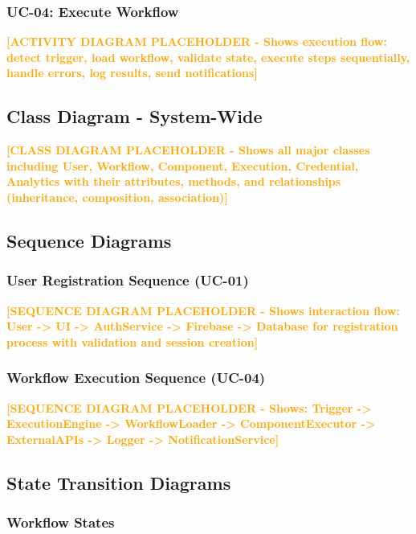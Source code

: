 \documentclass[12pt,a4paper]{article}
\begin{document}
\subsubsection{UC-04: Execute Workflow}

\textcolor{orange}{\textbf{[ACTIVITY DIAGRAM PLACEHOLDER - Shows execution flow: detect trigger, load workflow, validate state, execute steps sequentially, handle errors, log results, send notifications]}}

\subsection{Class Diagram - System-Wide}

\textcolor{orange}{\textbf{[CLASS DIAGRAM PLACEHOLDER - Shows all major classes including User, Workflow, Component, Execution, Credential, Analytics with their attributes, methods, and relationships (inheritance, composition, association)]}}

\subsection{Sequence Diagrams}

\subsubsection{User Registration Sequence (UC-01)}

\textcolor{orange}{\textbf{[SEQUENCE DIAGRAM PLACEHOLDER - Shows interaction flow: User -> UI -> AuthService -> Firebase -> Database for registration process with validation and session creation]}}

\subsubsection{Workflow Execution Sequence (UC-04)}

\textcolor{orange}{\textbf{[SEQUENCE DIAGRAM PLACEHOLDER - Shows: Trigger -> ExecutionEngine -> WorkflowLoader -> ComponentExecutor -> ExternalAPIs -> Logger -> NotificationService]}}

\subsection{State Transition Diagrams}

\subsubsection{Workflow States}
\end{document}
